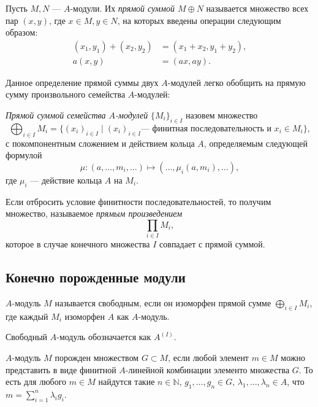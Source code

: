     \begin{Def}
        Пусть $M, N$ --- $A$-модули. Их \textit{прямой суммой $M \oplus N$} называется множество всех пар $(x, y)$, где $x \in M, y \in N$,
        на которых введены операции следующим образом:
        \begin{align*}
            (x_1, y_1) + (x_2, y_2) &= (x_1 + x_2, y_1 + y_2),\\
            a(x, y) &= (ax, ay).
        \end{align*}
    \end{Def}

    Данное определение прямой суммы двух $A$-модулей легко обобщить на прямую сумму произвольного семейства $A$-модулей:
    \begin{Def}
        \textit{Прямой суммой семейства $A$-модулей} $\{M_i\}_{i \in I}$ назовем множество 
        $$
            \bigoplus_{i \in I} M_i = \{(x_i)_{i \in I} \mid (x_i)_{i \in I} \text{--- финитная последовательность и } x_i \in M_i\},
        $$
        с покомпонентным сложением и действием кольца $A$, определяемым следующей формулой
        $$
            \mu : (a, \dots, m_i, \dots) \mapsto (\dots, \mu_i(a, m_i), \dots),
        $$
        где $\mu_i$ --- действие кольца $A$ на $M_i$.
    \end{Def}

    Если отбросить условие финитности последовательностей, то получим множество, называемое \textit{прямым произведением}
    $$
        \prod_{i \in I} M_i,
    $$ 
    которое в случае конечного множества $I$ совпадает с прямой суммой.

    \subsection{Конечно порожденные модули}

    \begin{Def}
        $A$-модуль $M$ называется свободным, если он изоморфен прямой сумме $\bigoplus_{i \in I} M_i$, где каждый $M_i$ изоморфен $A$ как $A$-модуль.
    \end{Def}

    Свободный $A$-модуль обозначается как $A^{(I)}$.

    \begin{Def}
        $A$-модуль $M$ порожден множеством $G \subset M$, если любой элемент $m \in M$ можно представить в виде финитной $A$-линейной комбинации элементо множества $G$.
        То есть для любого $m \in M$ найдутся такие $n \in \mathbb{N}$, $g_1, \dots, g_n \in G$, $\lambda_1, \dots, \lambda_n \in A$, что $m = \sum_{i = 1}^n \lambda_i g_i$.
    \end{Def}

